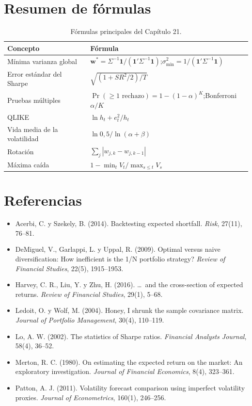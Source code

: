 \section{Resumen de fórmulas}

\begin{table}[H]
\centering\small
\begin{tabular}{@{}ll@{}}
\toprule
Concepto & Fórmula \\
\midrule
Mínima varianza global & $\mathbf w^*=\Sigma^{-1}\mathbf 1/(\mathbf 1'\Sigma^{-1}\mathbf 1)$;\quad $\sigma^2_{\min}=1/(\mathbf 1'\Sigma^{-1}\mathbf 1)$ \\
Error estándar del Sharpe & $\sqrt{(1+SR^2/2)/T}$ \\
Pruebas múltiples & $\Pr(\ge1\text{ rechazo})=1-(1-\alpha)^K$;\quad Bonferroni $\alpha/K$ \\
QLIKE & $\ln h_t+e_t^2/h_t$ \\
Vida media de la volatilidad & $\ln0{,}5/\ln(\alpha+\beta)$ \\
Rotación & $\sum_j|w_{j,k}-w_{j,k-1}|$ \\
Máxima caída & $1-\min_t V_t/\max_{s\le t}V_s$ \\
\bottomrule
\end{tabular}
\caption{Fórmulas principales del Capítulo 21.}
\end{table}

\section*{Referencias}
\begin{itemize}[leftmargin=*]
  \item Acerbi, C. y Szekely, B. (2014). Backtesting expected shortfall. \emph{Risk}, 27(11), 76--81.
  \item DeMiguel, V., Garlappi, L. y Uppal, R. (2009). Optimal versus naive diversification: How inefficient is the 1/N portfolio strategy?
        \emph{Review of Financial Studies}, 22(5), 1915--1953.
  \item Harvey, C. R., Liu, Y. y Zhu, H. (2016). \ldots\ and the cross-section of expected returns. \emph{Review of Financial Studies}, 29(1), 5--68.
  \item Ledoit, O. y Wolf, M. (2004). Honey, I shrunk the sample covariance matrix. \emph{Journal of Portfolio Management}, 30(4), 110--119.
  \item Lo, A. W. (2002). The statistics of Sharpe ratios. \emph{Financial Analysts Journal}, 58(4), 36--52.
  \item Merton, R. C. (1980). On estimating the expected return on the market: An exploratory investigation. \emph{Journal of Financial Economics},
        8(4), 323--361.
  \item Patton, A. J. (2011). Volatility forecast comparison using imperfect volatility proxies. \emph{Journal of Econometrics}, 160(1), 246--256.
\end{itemize}
